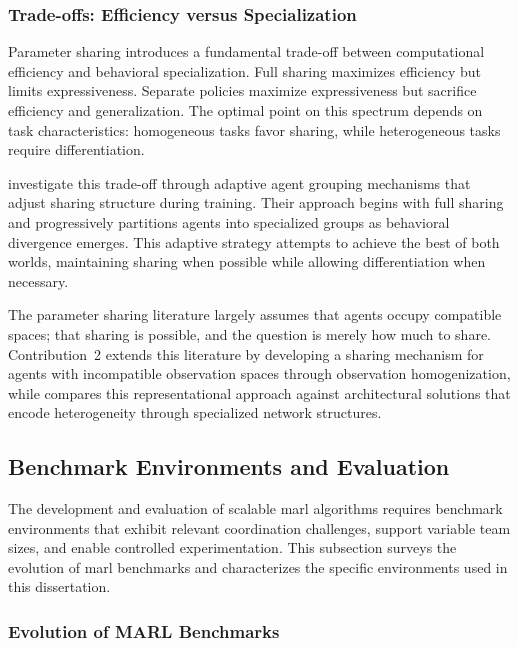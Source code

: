 \subsubsection{Trade-offs: Efficiency versus Specialization}
\label{subsubsec:trade-offs_eff_v_spec}

Parameter sharing introduces a fundamental trade-off between 
computational efficiency and behavioral specialization. 
Full sharing maximizes efficiency but limits expressiveness. Separate 
policies maximize expressiveness but sacrifice efficiency and generalization. 
The optimal point on this spectrum depends on task characteristics: 
homogeneous tasks favor sharing, while heterogeneous tasks require differentiation.

\cite{hao2022} investigate this trade-off through adaptive agent 
grouping mechanisms that adjust sharing structure during training. 
Their approach begins with full sharing and progressively partitions 
agents into specialized groups as behavioral divergence emerges. 
This adaptive strategy attempts to achieve the best of both worlds, 
maintaining sharing when possible while allowing differentiation when necessary.

The parameter sharing literature largely assumes that agents occupy compatible spaces;
that sharing is possible, and the question is merely how much to share. 
Contribution~2 extends this literature by developing a sharing mechanism 
for agents with incompatible observation spaces through observation homogenization,
while  compares this representational approach against architectural 
solutions that encode heterogeneity through specialized network structures.


\subsection{Benchmark Environments and Evaluation}
\label{subsec:benchmark-environments}

The development and evaluation of scalable \gls{marl} algorithms requires 
benchmark environments that exhibit relevant coordination challenges, 
support variable team sizes, and enable controlled experimentation. 
This subsection surveys the evolution of \gls{marl} benchmarks and 
characterizes the specific environments used in this dissertation.

\subsubsection{Evolution of MARL Benchmarks}

